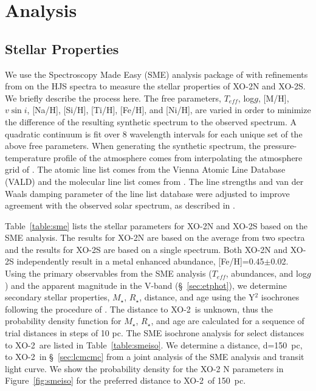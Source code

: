 \documentclass{emulateapj}
\newcommand{\xon}{XO-2}
\newcommand{\vDs}{150}
\newcommand{\vFeH}{0.45}
\newcommand{\eFeH}{0.02}
\begin{document}
\section{Analysis}

\subsection{Stellar Properties}\label{sec:sme}

We use the Spectroscopy Made Easy (SME) analysis package of
\citet{VAL96} with refinements from \citet{VAL05} on the HJS spectra
to measure the stellar properties of \xon N and \xon S.  We briefly
describe the process here.  The free parameters, $T_{eff}$, log$g$,
[M/H], $v\sin{i}$, [Na/H], [Si/H], [Ti/H], [Fe/H], and [Ni/H], are
varied in order to minimize the difference of the resulting synthetic
spectrum to the observed spectrum.  A quadratic continuum is fit over
8 wavelength intervals for each unique set of the above free
parameters.  When generating the synthetic spectrum, the
pressure-temperature profile of the atmosphere comes from
interpolating the atmosphere grid of \citet{KUR92}.  The atomic line
list comes from the Vienna Atomic Line Database (VALD) \citep{PIS95}
and the molecular line list comes from \citet{KUR93}.  The line
strengths and van der Waals damping parameter of the line list
database were adjusted to improve agreement with the observed solar
spectrum, as described in \citet{VAL05}.

Table~\ref{table:sme} lists the stellar parameters for XO-2N and XO-2S
based on the SME analysis.  The results for \xon N are based on the
average from two spectra and the results for \xon S are based on a
single spectrum.  Both \xon N and \xon S independently result in a
metal enhanced abundance, [Fe/H]=\vFeH$\pm$\eFeH.  Using the primary
observables from the SME analysis ($T_{eff}$, abundances, and log$g$)
and the apparent magnitude in the V-band (\S~\ref{sec:etphot}), we
determine secondary stellar properties, $M_{\star}$, $R_{\star}$,
distance, and age using the Y$^{2}$ isochrones \citep{YI01} following the procedure
of \citet{VAL05}.  The distance to \xon\ is unknown, thus the
probability density function for $M_{\star}$, $R_{\star}$, and age are
calculated for a sequence of trial distances in steps of 10 pc.  The SME
isochrone analysis for select distances to \xon\ are listed in
Table~\ref{table:smeiso}.  We determine a distance, d=\vDs\ pc, to
\xon\ in \S~\ref{sec:lcmcmc} from a joint analysis of the SME analysis
and transit light curve.  We show the probability density for the \xon
N parameters in Figure~\ref{fig:smeiso} for the preferred distance to
\xon\ of \vDs\ pc.
\end{document}
